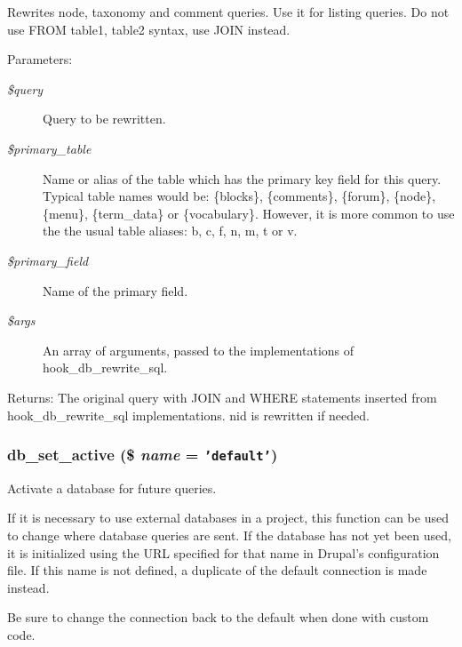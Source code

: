 Rewrites node, taxonomy and comment queries. Use it for listing queries. Do not use FROM table1, table2 syntax, use JOIN instead.

\begin{Desc}
\item[Parameters:]
\begin{description}
\item[{\em \$query}]Query to be rewritten. \item[{\em \$primary\_\-table}]Name or alias of the table which has the primary key field for this query. Typical table names would be: \{blocks\}, \{comments\}, \{forum\}, \{node\}, \{menu\}, \{term\_\-data\} or \{vocabulary\}. However, it is more common to use the the usual table aliases: b, c, f, n, m, t or v. \item[{\em \$primary\_\-field}]Name of the primary field. \item[{\em \$args}]An array of arguments, passed to the implementations of hook\_\-db\_\-rewrite\_\-sql. \end{description}
\end{Desc}
\begin{Desc}
\item[Returns:]The original query with JOIN and WHERE statements inserted from hook\_\-db\_\-rewrite\_\-sql implementations. nid is rewritten if needed. \end{Desc}
\hypertarget{group__database_g84e68f6dbf9cdec826e7b3852d1b283c}{
\subsubsection[{db\_\-set\_\-active}]{\setlength{\rightskip}{0pt plus 5cm}db\_\-set\_\-active (\$ {\em name} = {\tt 'default'})}}
\label{group__database_g84e68f6dbf9cdec826e7b3852d1b283c}


Activate a database for future queries.

If it is necessary to use external databases in a project, this function can be used to change where database queries are sent. If the database has not yet been used, it is initialized using the URL specified for that name in Drupal's configuration file. If this name is not defined, a duplicate of the default connection is made instead.

Be sure to change the connection back to the default when done with custom code.

